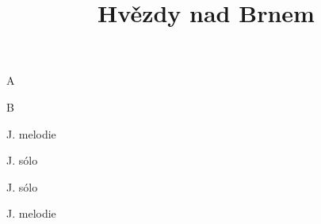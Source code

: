\documentclass[timestamp]{jazzgrid}
\title{\textbf{Hvězdy nad Brnem}}
\begin{document}
\maketitle
\begin{musicsection}{A}
\barline
	{\barfour{}
		{}
		{}
		{}
		{}
	}
	{\barfour{}
		{}
		{}
		{}
		{}
	}
	{\barfour{}
		{}
		{}
		{}
		{}
	}
	{\barfour{}
		{}
		{}
		{}
		{}
	}
\barline
	{\barfour{}
		{}
		{}
		{}
		{}
	}
	{\barfour{}
		{}
		{}
		{}
		{}
	}
	{
		{}
		{}
		{}
		{}
	}
	{\barfour{}
		{}
		{}
		{}
		{}
	}
	{
		{}
		{}
		{}
		{}
	}
	{\barfour{}
		{}
		{}
		{}
		{}
	}
\end{musicsection}

\begin{musicsection}{B}
\barline
	{\barfour{}
		{}
		{}
		{}
		{}
	}
	{\barfour{}
		{}
		{}
		{}
		{}
	}
	{\barfour{}
		{}
		{}
		{}
		{}
	}
	{\barfour{}
		{}
		{}
		{}
		{}
	}
\barline
	{\barfour{}
		{}
		{}
		{}
		{}
	}
	{\barfour{}
		{}
		{}
		{}
		{}
	}
	{\barfour{}
		{}
		{}
		{}
		{}
	}
	{\barfour{}
		{}
		{}
		{}
		{}
	}
\end{musicsection}
\begin{multicols*}{2}
	\footnotesize
	\begin{description}[noitemsep,align=right,labelwidth=\widthof{\bfseries{AABA}}]
	\item [AABA] J. melodie
	\item [AABA] J. sólo
	\item [AABA] J. sólo
	\item [AABA] J. melodie
\end{description}
\end{multicols*}
\end{document}
